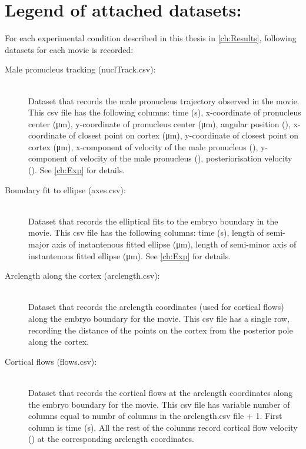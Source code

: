 \section*{Legend of attached datasets:}
For each experimental condition described in this thesis in \autoref{ch:Results}, following datasets for each movie is recorded:
\begin{description}
\item[Male pronucleus tracking (nuclTrack.csv):]\hfill\\
Dataset that records the male pronucleus trajectory observed in the movie. This csv file has the following columns: time (\si{\second}), x-coordinate of pronucleus center (\si{\micro\meter}), y-coordinate of pronucleus center (\si{\micro\meter}), angular position (\si{\unitAngle}), x-coordinate of closest point on cortex (\si{\micro\meter}), y-coordinate of closest point on cortex (\si{\micro\meter}), x-component of velocity of the male pronucleus (\si{\unitPostVel}), y-component of velocity of the male pronucleus (\si{\unitPostVel}), posteriorisation velocity (\si{\unitPostVel}). See \autoref{ch:Exp} for details.
\item[Boundary fit to ellipse (axes.csv):]\hfill\\
Dataset that records the elliptical fits to the embryo boundary in the movie. This csv file has the following columns: time (\si{\second}), length of semi-major axis of instantenous fitted ellipse (\si{\micro\meter}), length of semi-minor axis of instantenous fitted ellipse (\si{\micro\meter}). See \autoref{ch:Exp} for details.
\item[Arclength along the cortex (arclength.csv):]\hfill\\
Dataset that records the arclength coordinates (used for cortical flows) along the embryo boundary for the movie. This csv file has a single row, recording the distance of the points on the cortex from the posterior pole along the cortex.
\item[Cortical flows (flows.csv):]\hfill\\
Dataset that records the cortical flows at the arclength coordinates along the embryo boundary for the movie. This csv file has variable number of columns equal to numbr of columns in the arclength.csv file + 1. First column is time (\si{\second}). All the rest of the columns record cortical flow velocity (\si{\unitPostVel}) at the corresponding arclength coordinates.
\end{description}

